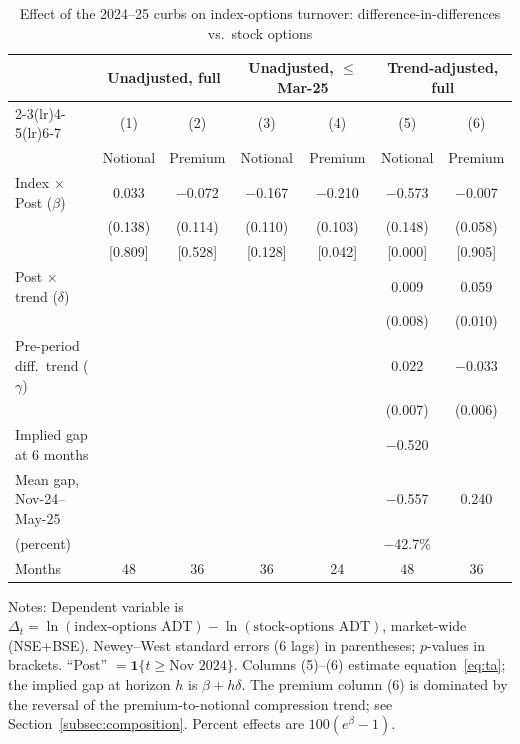 \documentclass[12pt]{article}
\begin{document}
\begin{table}[H]
\centering
\caption{Effect of the 2024--25 curbs on index-options turnover:
difference-in-differences vs.\ stock options}
\label{tab:main}
\small
\begin{threeparttable}
\begin{tabular}{lcccccc}
\toprule
 & \multicolumn{2}{c}{Unadjusted, full} &
 \multicolumn{2}{c}{Unadjusted, $\leq$ Mar-25} &
 \multicolumn{2}{c}{Trend-adjusted, full} \\
\cmidrule(lr){2-3}\cmidrule(lr){4-5}\cmidrule(lr){6-7}
 & (1) & (2) & (3) & (4) & (5) & (6) \\
 & Notional & Premium & Notional & Premium & Notional & Premium \\
\midrule
Index $\times$ Post ($\beta$) & 0.033 & $-$0.072 & $-$0.167 & $-$0.210 & $-$0.573 & $-$0.007 \\
 & (0.138) & (0.114) & (0.110) & (0.103) & (0.148) & (0.058) \\
 & [0.809] & [0.528] & [0.128] & [0.042] & [0.000] & [0.905] \\
Post $\times$ trend ($\delta$) & & & & & 0.009 & 0.059 \\
 & & & & & (0.008) & (0.010) \\
Pre-period diff.\ trend ($\gamma$) & & & & & 0.022 & $-$0.033 \\
 & & & & & (0.007) & (0.006) \\
\midrule
Implied gap at 6 months & & & & & $-$0.520 & \\
Mean gap, Nov-24--May-25 & & & & & $-$0.557 & 0.240 \\
\quad (percent) & & & & & $-$42.7\% & \\
Months & 48 & 36 & 36 & 24 & 48 & 36 \\
\bottomrule
\end{tabular}
\begin{tablenotes}\footnotesize
\item Notes: Dependent variable is $\Delta_t = \ln(\text{index-options
ADT}) - \ln(\text{stock-options ADT})$, market-wide (NSE+BSE).
Newey--West standard errors (6 lags) in parentheses; $p$-values in
brackets. ``Post'' $= \mathbf{1}\{t\geq \text{Nov 2024}\}$.
Columns (5)--(6) estimate equation~\eqref{eq:ta}; the implied gap at
horizon $h$ is $\beta + h\delta$. The premium column (6) is dominated by
the reversal of the premium-to-notional compression trend; see
Section~\ref{subsec:composition}. Percent effects are $100(e^{\beta}-1)$.
\end{tablenotes}
\end{threeparttable}
\end{table}
\end{document}
